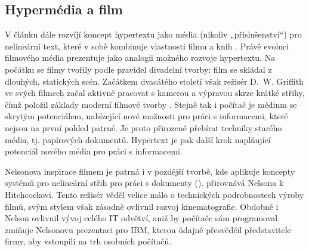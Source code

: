 \subsection{Hypermédia a film}

V článku  dále rozvíjí koncept hypertextu jako média (nikoliv „příslušenství“) pro nelineární text, které v sobě kombinuje vlastnosti filmu a knih \autocite[191,195-196]{Nelson1967}. Právě evoluci filmového média prezentuje jako analogii možného rozvoje hypertextu. Na počátku se filmy tvořily podle pravidel divadelní tvorby: film se skládal z dlouhých, statických scén. Začátkem dvacátého století však režisér D.~W. Griffith ve svých filmech začal aktivně pracovat s kamerou a výpravou skrze krátké střihy, čímž položil základy moderní filmové tvorby \autocite[203]{Nelson1967}. Stejně tak i počítač je médium se skrytým potenciálem, nabízející nové možnosti pro práci s informacemi, které nejsou na první pohled patrné. Je proto přirozené přebírat techniky starého média, tj. papírových dokumentů. Hypertext je pak další krok naplňující potenciál nového média pro práci s informacemi.




Nelsonova inspirace filmem je patrná i v pozdější tvorbě, kde aplikuje koncepty systémů pro nelineární střih pro práci s dokumenty ().
\Textcite[209]{Glut} přirovnává Nelsona k Hitchcockovi. Tento režisér věděl velice málo o technických podrobnostech výroby filmů, svým stylem však zásadně ovlivnil rozvoj kinematografie.
Obdobně i Nelson ovlivnil vývoj celého IT odvětví, aniž by počítače sám programoval. \Textcite{Markoff2007} zmiňuje Nelsonovu prezentaci pro IBM, kterou údajně přesvědčil představitele firmy, aby vstoupili na trh osobních počítačů.

